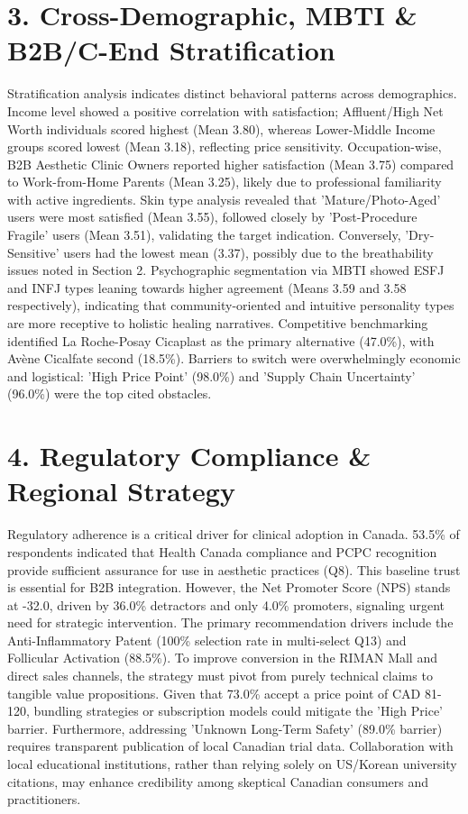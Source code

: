 \documentclass[10pt,twocolumn,a4paper]{article}
\begin{document}
\section{3. Cross-Demographic, MBTI \& B2B/C-End Stratification}
Stratification analysis indicates distinct behavioral patterns across demographics. Income level showed a positive correlation with satisfaction; Affluent/High Net Worth individuals scored highest (Mean 3.80), whereas Lower-Middle Income groups scored lowest (Mean 3.18), reflecting price sensitivity. Occupation-wise, B2B Aesthetic Clinic Owners reported higher satisfaction (Mean 3.75) compared to Work-from-Home Parents (Mean 3.25), likely due to professional familiarity with active ingredients. Skin type analysis revealed that 'Mature/Photo-Aged' users were most satisfied (Mean 3.55), followed closely by 'Post-Procedure Fragile' users (Mean 3.51), validating the target indication. Conversely, 'Dry-Sensitive' users had the lowest mean (3.37), possibly due to the breathability issues noted in Section 2. Psychographic segmentation via MBTI showed ESFJ and INFJ types leaning towards higher agreement (Means 3.59 and 3.58 respectively), indicating that community-oriented and intuitive personality types are more receptive to holistic healing narratives. Competitive benchmarking identified La Roche-Posay Cicaplast as the primary alternative (47.0\%), with Avène Cicalfate second (18.5\%). Barriers to switch were overwhelmingly economic and logistical: 'High Price Point' (98.0\%) and 'Supply Chain Uncertainty' (96.0\%) were the top cited obstacles.
\section{4. Regulatory Compliance \& Regional Strategy}
Regulatory adherence is a critical driver for clinical adoption in Canada. 53.5\% of respondents indicated that Health Canada compliance and PCPC recognition provide sufficient assurance for use in aesthetic practices (Q8). This baseline trust is essential for B2B integration. However, the Net Promoter Score (NPS) stands at -32.0, driven by 36.0\% detractors and only 4.0\% promoters, signaling urgent need for strategic intervention. The primary recommendation drivers include the Anti-Inflammatory Patent (100\% selection rate in multi-select Q13) and Follicular Activation (88.5\%). To improve conversion in the RIMAN Mall and direct sales channels, the strategy must pivot from purely technical claims to tangible value propositions. Given that 73.0\% accept a price point of CAD 81-120, bundling strategies or subscription models could mitigate the 'High Price' barrier. Furthermore, addressing 'Unknown Long-Term Safety' (89.0\% barrier) requires transparent publication of local Canadian trial data. Collaboration with local educational institutions, rather than relying solely on US/Korean university citations, may enhance credibility among skeptical Canadian consumers and practitioners.
\end{document}
